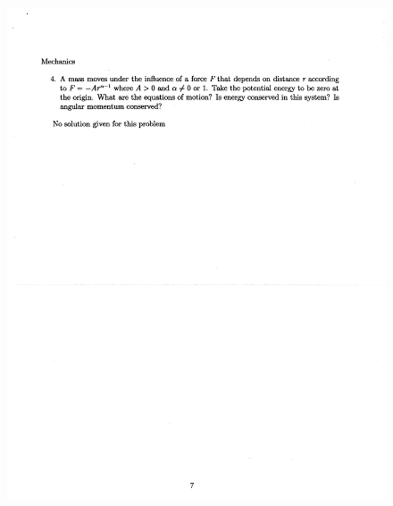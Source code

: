 \documentclass[10pt,a4paper]{article}
\begin{document}
\begin{figure}[H]
 \centering
 \includegraphics[width=16cm]{pdf/1-1T28.png}
\end{figure}
 \newpage
\end{document}
